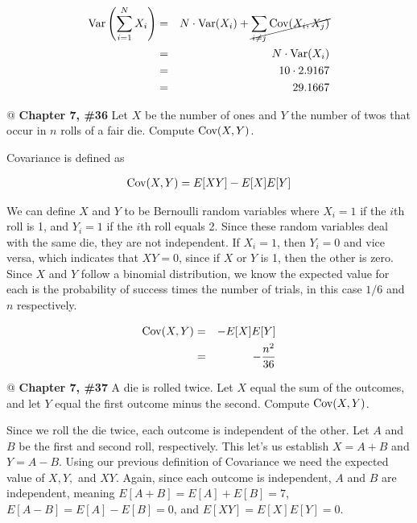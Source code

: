 \documentclass[11pt]{article}\usepackage[]{graphicx}\usepackage[]{xcolor}
\begin{document}
\begin{easylist}[enumerate]
    \begin{equation*}
        \begin{aligned}
            \text{Var}\left( \sum_{i=1}^N X_i \right) &=& N \cdot \text{Var}(X_i) + \cancel{\sum_{i\neq j} \text{Cov}(X_i, X_j)}\\
            &=& N \cdot \text{Var}(X_i)\\
            &=& 10 \cdot 2.9167\\
            &=& 29.1667\\
        \end{aligned}
    \end{equation*}

    @ \textbf{Chapter 7, \#36} Let $X$ be the number of ones and $Y$ the number of twos that occur in $n$ rolls of a
    fair die. Compute $\text{Cov}(X, Y)$.\newline

    Covariance is defined as

    \begin{equation*}
        \begin{aligned}
            \text{Cov}(X, Y) = E[XY] - E[X] E[Y]
        \end{aligned}
    \end{equation*}

    We can define $X$ and $Y$ to be Bernoulli random variables where $X_i=1$ if the $i$th roll is 1, and $Y_i=1$ if the
    $i$th roll equals 2. Since these random variables deal with the same die, they are not independent. If $X_i=1$, then
    $Y_i=0$ and vice versa, which indicates that $XY=0$, since if $X$ or $Y$ is 1, then the other is zero. Since $X$ and
    $Y$ follow a binomial distribution, we know the expected value for each is the probability of success times the
    number of trials, in this case $1/6$ and $n$ respectively.

    \begin{equation*}
        \begin{aligned}
            \text{Cov}(X, Y) &=& -E[X]E[Y]\\
            &=& -\frac{n^2}{36}
        \end{aligned}
    \end{equation*}


    @ \textbf{Chapter 7, \#37} A die is rolled twice. Let $X$ equal the sum of the outcomes, and let $Y$ equal the first
    outcome minus the second. Compute $\text{Cov}(X, Y)$.\newline

    Since we roll the die twice, each outcome is independent of the other. Let $A$ and $B$ be the first and second roll,
    respectively. This let's us establish $X=A+B$ and $Y=A-B$. Using our previous definition of Covariance we need the
    expected value of $X, Y,$ and $XY$. Again, since each outcome is independent, $A$ and $B$ are independent, meaning
    $E[A+B] = E[A] + E[B] = 7$, $E[A-B] = E[A] - E[B] = 0$, and $E[XY] = E[X]E[Y] = 0$.


\end{easylist}
\end{document}
